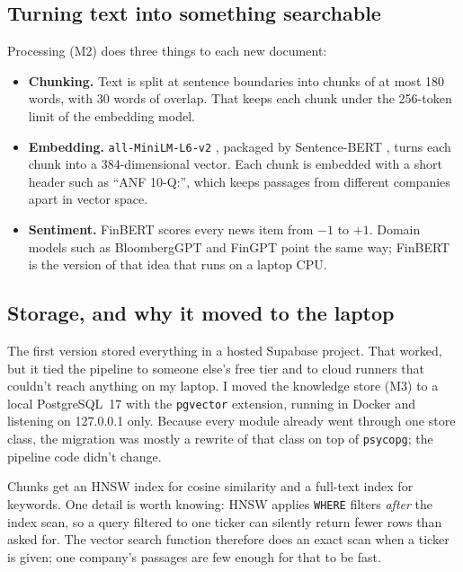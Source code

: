\documentclass[11pt,a4paper]{article}
\newcommand{\code}[1]{\texttt{#1}}
\begin{document}
\subsection{Turning text into something searchable}

Processing (M2) does three things to each new document:

\begin{itemize}
  \item \textbf{Chunking.} Text is split at sentence boundaries into chunks of at most 180 words, with 30
        words of overlap. That keeps each chunk under the 256-token limit of the embedding model.
  \item \textbf{Embedding.} \code{all-MiniLM-L6-v2} \cite{wang2020minilm}, packaged by Sentence-BERT
        \cite{reimers2019sentencebert}, turns each chunk into a 384-dimensional vector. Each chunk is
        embedded with a short header such as ``ANF 10-Q:'', which keeps passages from different companies
        apart in vector space.
  \item \textbf{Sentiment.} FinBERT \cite{araci2019finbert} scores every news item from $-1$ to $+1$.
        Domain models such as BloombergGPT \cite{wu2023bloomberggpt} and FinGPT \cite{yang2023fingpt}
        point the same way; FinBERT is the version of that idea that runs on a laptop CPU.
\end{itemize}

\subsection{Storage, and why it moved to the laptop}

The first version stored everything in a hosted Supabase project. That worked, but it tied the
pipeline to someone else's free tier and to cloud runners that couldn't reach anything on my laptop.
I moved the knowledge store (M3) to a local PostgreSQL~17 with the \code{pgvector} extension, running in
Docker and listening on 127.0.0.1 only. Because every module already went through one store class, the
migration was mostly a rewrite of that class on top of \code{psycopg}; the pipeline code didn't change.

Chunks get an HNSW index \cite{malkov2016efficient} for cosine similarity and a full-text index for
keywords. One detail is worth knowing: HNSW applies \code{WHERE} filters \emph{after} the index scan, so
a query filtered to one ticker can silently return fewer rows than asked for. The vector search function
therefore does an exact scan when a ticker is given; one company's passages are few enough for that to be
fast.
\end{document}
